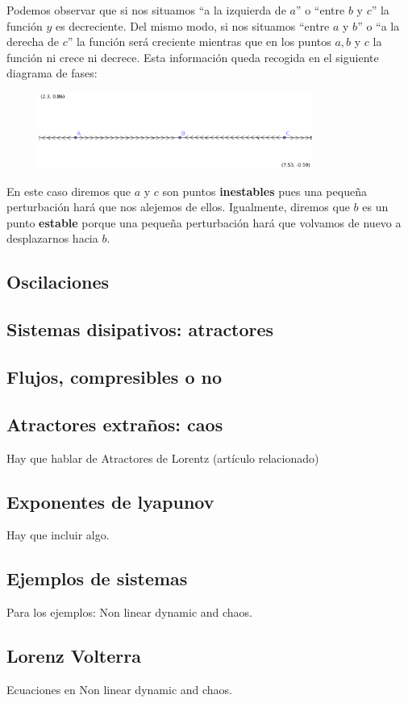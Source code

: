 Podemos observar que si nos situamos ``a la izquierda de $a$'' o ``entre $b$ y $c$'' la función $y$ es decreciente. Del mismo modo, si nos situamos ``entre $a$ y $b$'' o ``a la derecha de $c$'' la función será creciente mientras que en los puntos $a, b$ y $c$ la función ni crece ni decrece. Esta información queda recogida en el siguiente diagrama de fases:

\begin{figure}[hbtp]
\centering
\includegraphics[width = 0.8\textwidth]{img/diagrama-fases.png}
\end{figure}

En este caso diremos que $a$ y $c$ son puntos \textbf{inestables} pues una pequeña perturbación hará que nos alejemos de ellos. Igualmente, diremos que $b$ es un punto \textbf{estable} porque una pequeña perturbación hará que volvamos de nuevo a desplazarnos hacia $b$.

\subsection{Oscilaciones}
\subsection{Sistemas disipativos: atractores}
\subsection{Flujos, compresibles o no}
\subsection{Atractores extraños: caos}
Hay que hablar de Atractores de Lorentz (artículo relacionado)
\subsection{Exponentes de lyapunov}
Hay que incluir algo.
\subsection{Ejemplos de sistemas}
Para los ejemplos: Non linear dynamic and chaos.
\subsection{Lorenz Volterra}
Ecuaciones en Non linear dynamic and chaos.

